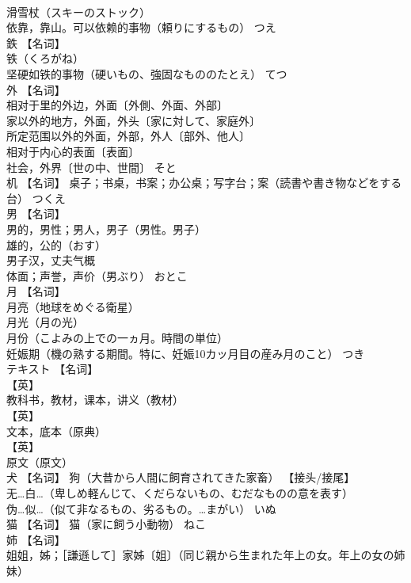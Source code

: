 \documentclass[8pt]{extreport}
\begin{document}
\begin{CJK}{UTF8}{min}
\\	滑雪杖（スキーのストック） 
\\	依靠，靠山。可以依赖的事物（頼りにするもの）	つえ	
\\	鉄	【名词】 
\\	铁（くろがね） 
\\	坚硬如铁的事物（硬いもの、強固なもののたとえ）	てつ	
\\	外	【名词】 
\\	相对于里的外边，外面〔外側、外面、外部〕 
\\	家以外的地方，外面，外头〔家に対して、家庭外〕 
\\	所定范围以外的外面，外部，外人〔部外、他人〕 
\\	相对于内心的表面〔表面〕 
\\	社会，外界〔世の中、世間〕	そと	
\\	机	【名词】 桌子；书桌，书案；办公桌；写字台；案（読書や書き物などをする台）	つくえ	
\\	男	【名词】 
\\	男的，男性；男人，男子（男性。男子） 
\\	雄的，公的（おす） 
\\	男子汉，丈夫气概 
\\	体面；声誉，声价（男ぶり）	おとこ	
\\	月	【名词】 
\\	月亮（地球をめぐる衛星） 
\\	月光（月の光） 
\\	月份（こよみの上での一ヵ月。時間の単位） 
\\	妊娠期（機の熟する期間。特に、妊娠10カッ月目の産み月のこと）	つき	
\\	テキスト	【名词】 
\\	【英】
\\	教科书，教材，课本，讲义（教材） 
\\	【英】
\\	文本，底本（原典） 
\\	【英】
\\	原文（原文）		
\\	犬	【名词】 狗（大昔から人間に飼育されてきた家畜） 【接头/接尾】 
\\	无…白…（卑しめ軽んじて、くだらないもの、むだなものの意を表す） 
\\	伪…似…（似て非なるもの、劣るもの。…まがい）	いぬ	
\\	猫	【名词】 猫（家に飼う小動物）	ねこ	
\\	姉	【名词】 
\\	姐姐，姊；［謙遜して］家姊〔姐〕（同じ親から生まれた年上の女。年上の女の姉妹） 

\end{CJK}
\end{document}
